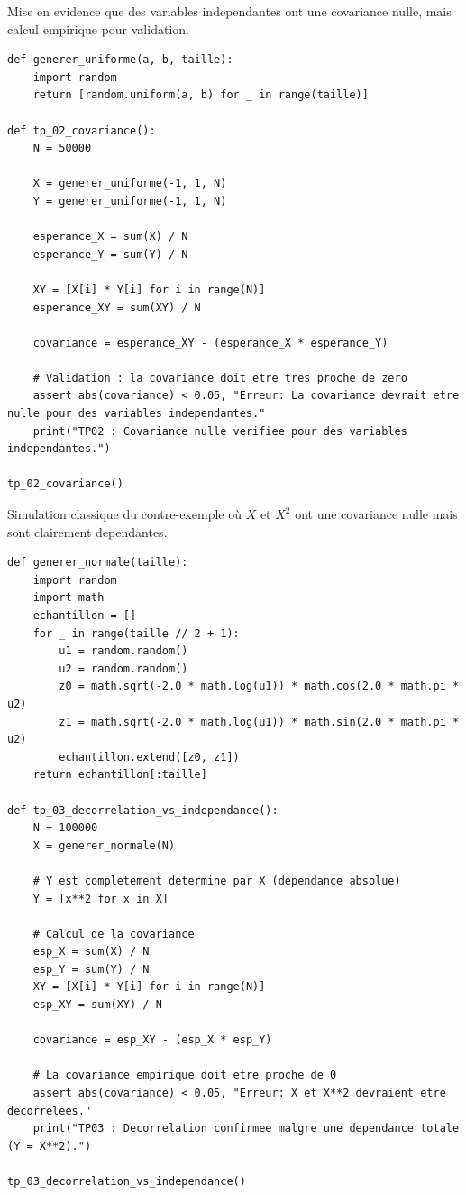\documentclass[11pt,a4paper]{article}
\begin{document}
Mise en evidence que des variables independantes ont une covariance nulle, mais calcul empirique pour validation.
\begin{lstlisting}
def generer_uniforme(a, b, taille):
    import random
    return [random.uniform(a, b) for _ in range(taille)]

def tp_02_covariance():
    N = 50000

    X = generer_uniforme(-1, 1, N)
    Y = generer_uniforme(-1, 1, N)

    esperance_X = sum(X) / N
    esperance_Y = sum(Y) / N

    XY = [X[i] * Y[i] for i in range(N)]
    esperance_XY = sum(XY) / N

    covariance = esperance_XY - (esperance_X * esperance_Y)

    # Validation : la covariance doit etre tres proche de zero
    assert abs(covariance) < 0.05, "Erreur: La covariance devrait etre nulle pour des variables independantes."
    print("TP02 : Covariance nulle verifiee pour des variables independantes.")

tp_02_covariance()
\end{lstlisting}


Simulation classique du contre-exemple où $X$ et $X^2$ ont une covariance nulle mais sont clairement dependantes.
\begin{lstlisting}
def generer_normale(taille):
    import random
    import math
    echantillon = []
    for _ in range(taille // 2 + 1):
        u1 = random.random()
        u2 = random.random()
        z0 = math.sqrt(-2.0 * math.log(u1)) * math.cos(2.0 * math.pi * u2)
        z1 = math.sqrt(-2.0 * math.log(u1)) * math.sin(2.0 * math.pi * u2)
        echantillon.extend([z0, z1])
    return echantillon[:taille]

def tp_03_decorrelation_vs_independance():
    N = 100000
    X = generer_normale(N)

    # Y est completement determine par X (dependance absolue)
    Y = [x**2 for x in X]

    # Calcul de la covariance
    esp_X = sum(X) / N
    esp_Y = sum(Y) / N
    XY = [X[i] * Y[i] for i in range(N)]
    esp_XY = sum(XY) / N

    covariance = esp_XY - (esp_X * esp_Y)

    # La covariance empirique doit etre proche de 0
    assert abs(covariance) < 0.05, "Erreur: X et X**2 devraient etre decorrelees."
    print("TP03 : Decorrelation confirmee malgre une dependance totale (Y = X**2).")

tp_03_decorrelation_vs_independance()
\end{lstlisting}
\end{document}
